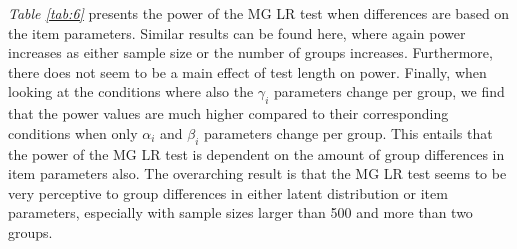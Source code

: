 \documentclass[Royal,sageapa,times,doublespace]{sagej}
\begin{document}
\indent \textit{Table \ref{tab:6}} presents the power of the MG LR test when differences are based on the item parameters. Similar results can be found here, where again power increases as either sample size or the number of groups increases. Furthermore, there does not seem to be a main effect of test length on power. Finally, when looking at the conditions where also the $\gamma_i$ parameters change per group, we find that the power values are much higher compared to their corresponding conditions when only $\alpha_i$ and $\beta_i$ parameters change per group. This entails that the power of the MG LR test is dependent on the amount of group differences in item parameters also. The overarching result is that the MG LR test seems to be very perceptive to group differences in either latent distribution or item parameters, especially with sample sizes larger than 500 and more than two groups. \\
\end{document}
